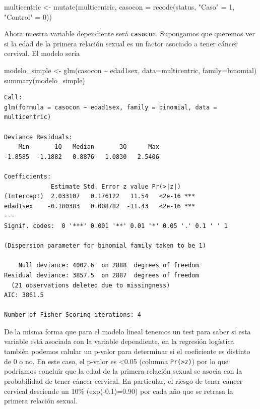 \documentclass[
]{book}
\newenvironment{Shaded}{\begin{snugshade}}{\end{snugshade}}
\newcommand{\AttributeTok}[1]{\textcolor[rgb]{0.77,0.63,0.00}{#1}}
\newcommand{\DecValTok}[1]{\textcolor[rgb]{0.00,0.00,0.81}{#1}}
\newcommand{\FunctionTok}[1]{\textcolor[rgb]{0.00,0.00,0.00}{#1}}
\newcommand{\NormalTok}[1]{#1}
\newcommand{\OtherTok}[1]{\textcolor[rgb]{0.56,0.35,0.01}{#1}}
\newcommand{\SpecialCharTok}[1]{\textcolor[rgb]{0.00,0.00,0.00}{#1}}
\newcommand{\StringTok}[1]{\textcolor[rgb]{0.31,0.60,0.02}{#1}}
\begin{document}
\begin{Shaded}
\begin{Highlighting}[]
\NormalTok{multicentric }\OtherTok{\textless{}{-}} \FunctionTok{mutate}\NormalTok{(multicentric,}
                       \AttributeTok{casocon =} \FunctionTok{recode}\NormalTok{(status,}
                                        \StringTok{"Caso"} \OtherTok{=} \DecValTok{1}\NormalTok{,}
                                        \StringTok{"Control"} \OtherTok{=} \DecValTok{0}\NormalTok{))}
\end{Highlighting}
\end{Shaded}

Ahora nuestra variable dependiente será \texttt{casocon}. Supongamos que queremos ver si la edad de la primera relación sexual es un factor asociado a tener cáncer cervival. El modelo sería

\begin{Shaded}
\begin{Highlighting}[]
\NormalTok{modelo\_simple }\OtherTok{\textless{}{-}} \FunctionTok{glm}\NormalTok{(casocon }\SpecialCharTok{\textasciitilde{}}\NormalTok{ edad1sex, }\AttributeTok{data=}\NormalTok{multicentric, }\AttributeTok{family=}\NormalTok{binomial)}
\FunctionTok{summary}\NormalTok{(modelo\_simple)}
\end{Highlighting}
\end{Shaded}

\begin{verbatim}
Call:
glm(formula = casocon ~ edad1sex, family = binomial, data = multicentric)

Deviance Residuals: 
    Min       1Q   Median       3Q      Max  
-1.8585  -1.1882   0.8876   1.0830   2.5406  

Coefficients:
             Estimate Std. Error z value Pr(>|z|)    
(Intercept)  2.033107   0.176122   11.54   <2e-16 ***
edad1sex    -0.100383   0.008782  -11.43   <2e-16 ***
---
Signif. codes:  0 '***' 0.001 '**' 0.01 '*' 0.05 '.' 0.1 ' ' 1

(Dispersion parameter for binomial family taken to be 1)

    Null deviance: 4002.6  on 2888  degrees of freedom
Residual deviance: 3857.5  on 2887  degrees of freedom
  (21 observations deleted due to missingness)
AIC: 3861.5

Number of Fisher Scoring iterations: 4
\end{verbatim}

De la misma forma que para el modelo lineal tenemos un test para saber si esta variable está asociada con la variable dependiente, en la regresión logística también podemos calular un p-valor para determinar si el coeficiente es distinto de 0 o no. En este caso, el p-valor es \textless0.05 (columna \texttt{Pr(\textgreater{}\textbar{}z\textbar{})}) por lo que podríamos concluir que la edad de la primera relación sexual se asocia con la probabilidad de tener cáncer cervical. En particular, el riesgo de tener cáncer cervical desciende un 10\% (exp(-0.1)=0.90) por cada año que se retrasa la primera relación sexual.
\end{document}

